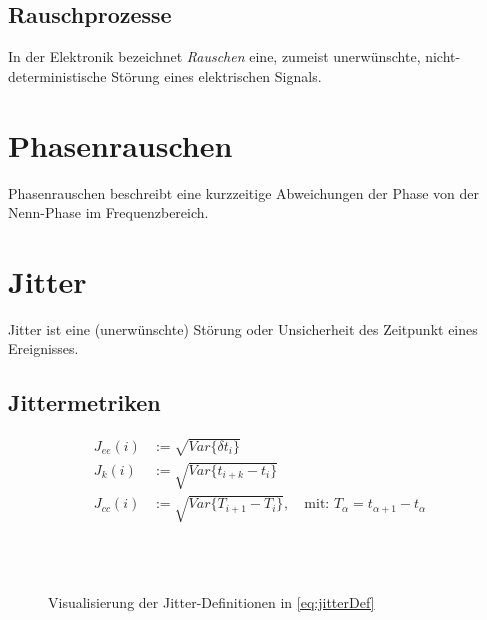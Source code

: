 \subsection{Rauschprozesse}
In der Elektronik bezeichnet \textit{Rauschen} eine, zumeist unerwünschte, nicht-\-deterministische Störung eines elektrischen Signals.

\section{Phasenrauschen}

\begin{definition}[Phasenrauschen]
	Phasenrauschen beschreibt eine kurzzeitige Abweichungen der Phase von der Nenn-Phase im Frequenzbereich. \cite{IEEErandom}
\end{definition}


\section{Jitter}

\begin{definition}[Jitter]
	Jitter ist eine (unerwünschte) Störung oder Unsicherheit des Zeitpunkt eines Ereignisses. \cite{Kundert2012}
\end{definition}

\subsection{Jittermetriken}

\begin{subequations}
	\label{eq:jitterDef}
	\begin{align}
	J_{ee}(i)&:=\sqrt{Var\{\delta t_i\}} \\
	J_k(i)&:=\sqrt{Var\{t_{i+k}-t_i\}} \\
	J_{cc}(i)&:=\sqrt{Var\{T_{i+1}-T_i\}}, \quad \text{mit: } T_\alpha=t_{\alpha+1}-t_\alpha
	\end{align}
\end{subequations}

\begin{figure}[H]
	\centering
	\\[4ex]
	\\[4ex]
	\caption{Visualisierung der Jitter-Definitionen in \autoref{eq:jitterDef}}
\end{figure}



